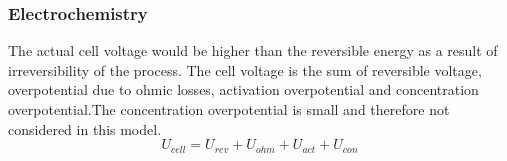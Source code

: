 \documentclass[11pt, a4paper]{article}
\begin{document}
\subsubsection{Electrochemistry} 
The actual cell voltage would be higher than the reversible energy  as a result of irreversibility of the process. The cell voltage is the sum of reversible voltage, overpotential due to ohmic losses, activation overpotential and concentration overpotential.The concentration overpotential is small and therefore not considered in this model.
\begin{equation} 
U_{cell}=U_{rev}+U_{ohm}+U_{act}+U_{con}
\end{equation} 

\end{document}
